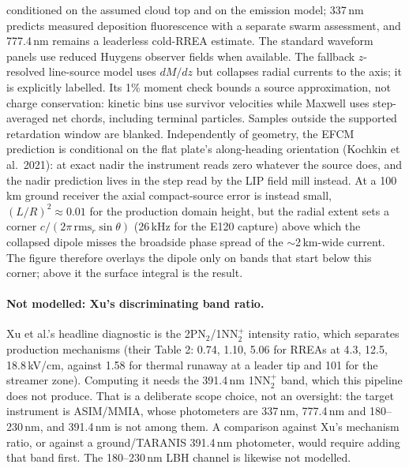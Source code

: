 \documentclass[11pt]{article}
\begin{document}
\begin{itemize}
    conditioned on the assumed cloud top and on the emission model; 337\,nm
    predicts measured deposition fluorescence with a separate swarm assessment,
    and 777.4\,nm remains a leaderless cold-RREA
    estimate. The standard waveform panels use reduced Huygens observer fields
    when available. The fallback $z$-resolved line-source model uses $dM/dz$ but
    collapses radial currents to the axis; it is explicitly labelled. Its 1\%
    moment check bounds a source approximation, not charge conservation:
    kinetic bins use survivor velocities while Maxwell uses step-averaged
    net chords, including terminal particles. Samples
    outside the supported retardation window are blanked. Independently of geometry, the EFCM prediction is conditional
    on the flat plate's along-heading orientation (Kochkin et al.\ 2021): at
    exact nadir the instrument reads zero whatever the source does, and the
    nadir prediction lives in the step read by the LIP field mill instead. At
    a 100\,km ground receiver the axial compact-source error is instead small,
    $(L/R)^2\approx0.01$ for the production domain height, but the radial
    extent sets a corner $c/(2\pi\,\mathrm{rms}_r\sin\theta)$ (26\,kHz for the E120 capture)
    above which the collapsed dipole misses the broadside phase spread of the
    $\sim$2\,km-wide current. The figure therefore overlays the dipole only
    on bands that start below this corner; above it the surface integral is
    the result.
\end{itemize}

\paragraph{Not modelled: Xu's discriminating band ratio.} Xu et al.'s
headline diagnostic is the 2PN$_2$/1NN$_2^+$ intensity ratio, which
separates production mechanisms (their Table 2: 0.74, 1.10, 5.06 for
RREAs at 4.3, 12.5, 18.8\,kV/cm, against 1.58 for thermal runaway at a
leader tip and 101 for the streamer zone).  Computing it needs the
391.4\,nm 1NN$_2^+$ band, which this pipeline does not produce.  That is
a deliberate scope choice, not an oversight: the target instrument is
ASIM/MMIA, whose photometers are 337\,nm, 777.4\,nm and 180--230\,nm,
and 391.4\,nm is not among them.  A comparison against Xu's mechanism
ratio, or against a ground/TARANIS 391.4\,nm photometer, would
require adding that band first.  The 180--230\,nm LBH channel is
likewise not modelled.
\end{document}
